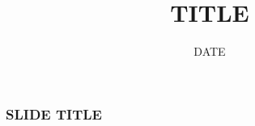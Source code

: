 \documentclass{beamer}
\title{TITLE}
\date{DATE}
\begin{document}
	\begin{frame}
		\titlepage
	\end{frame}

	\begin{frame}
		\frametitle{SLIDE TITLE}
	\end{frame}

\end{document}
